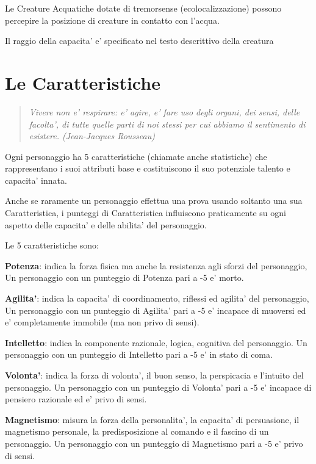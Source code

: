 \documentclass[a4paper,11pt,twoside,openany]{book}
\begin{document}
	Le Creature Acquatiche dotate di tremorsense (ecolocalizzazione) possono percepire la posizione di creature in contatto con l’acqua.
	
	Il raggio della capacita' e' specificato nel testo descrittivo della creatura
	
	\pagebreak
	
	\section{Le Caratteristiche}
	
	\label{le-caratteristiche}
	
	\begin{quote}\textit{Vivere non e' respirare: e' agire, e' fare uso degli organi, dei sensi, delle facolta', di tutte quelle parti di noi stessi per cui abbiamo il sentimento di esistere. (Jean-Jacques Rousseau)
	}\end{quote}
	
	
	Ogni personaggio ha 5 caratteristiche (chiamate anche statistiche) che rappresentano i suoi attributi base e costituiscono il suo potenziale talento e capacita' innata. 
	
	Anche se raramente un personaggio effettua una prova usando soltanto una sua Caratteristica, i punteggi di Caratteristica influiscono praticamente su ogni aspetto delle capacita' e delle abilita' del personaggio.
	
	Le 5 caratteristiche sono:
	
	\textbf{Potenza}: indica la forza fisica ma anche la resistenza agli sforzi del personaggio, Un personaggio con un punteggio di Potenza pari a -5 e' morto.
	
	\textbf{Agilita'}: indica la capacita' di coordinamento, riflessi ed agilita' del personaggio, Un personaggio con un punteggio di Agilita' pari a -5 e' incapace di muoversi ed e' completamente immobile (ma non privo di sensi).
	
	\textbf{Intelletto}: indica la componente razionale, logica, cognitiva del personaggio. Un personaggio con un punteggio di Intelletto pari a -5 e' in stato di coma.
	
	\textbf{Volonta'}: indica la forza di volonta', il buon senso, la perspicacia e l'intuito del personaggio. Un personaggio con un punteggio di Volonta' pari a -5 e' incapace di pensiero razionale ed e' privo di sensi.
	
	\textbf{Magnetismo}: misura la forza della personalita', la capacita' di persuasione, il magnetismo personale, la predisposizione al comando e il fascino di un personaggio. Un personaggio con un punteggio di Magnetismo pari a -5 e' privo di sensi.
	
\end{document}
